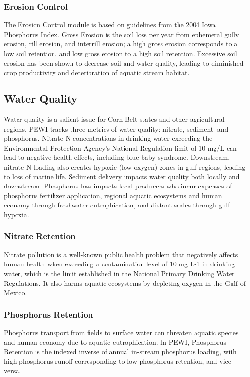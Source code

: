 \documentclass[11pt]{article}
\begin{document}
 
\cleardoublepage
\newpage

\subsubsection{Erosion Control}
The Erosion Control module is based on guidelines from the 2004 Iowa Phosphorus Index. Gross Erosion is the soil loss per year from ephemeral gully erosion, rill erosion, and interrill erosion; a high gross erosion corresponds to a low soil retention, and low gross erosion to a high soil retention. Excessive soil erosion has been shown to decrease soil and water quality, leading to diminished crop productivity and deterioration of aquatic stream habitat.\cite{36}

\subsection{Water Quality}
Water quality is a salient issue for Corn Belt states and other agricultural regions. PEWI tracks three metrics of water quality: nitrate, sediment, and phosphorus. Nitrate-N concentrations in drinking water exceeding the Environmental Protection Agency’s National Regulation limit of 10 mg/L can lead to negative health effects, including blue baby syndrome.\cite{37}  Downstream, nitrate-N loading also creates hypoxic (low-oxygen) zones in gulf regions, leading to loss of marine life.\cite{38}  Sediment delivery impacts water quality both locally and downstream.\cite{39} Phosphorus loss impacts local producers who incur expenses of phosphorus fertilizer application, regional aquatic ecosystems and human economy through freshwater eutrophication, and distant scales through gulf hypoxia.\cite{40} 

\subsubsection{Nitrate Retention}
Nitrate pollution is a well-known public health problem that negatively affects human health when exceeding a contamination level of 10 mg L-1 in drinking water, which is the limit established in the National Primary Drinking Water Regulations.  It also harms aquatic ecosystems by depleting oxygen in the Gulf of Mexico.\cite{41}

\subsubsection{Phosphorus Retention}
Phosphorus transport from fields to surface water can threaten aquatic species and human economy due to aquatic eutrophication. In PEWI, Phosphorus Retention is the indexed inverse of annual in-stream phosphorus loading, with high phosphorus runoff corresponding to low phosphorus retention, and vice versa.
\end{document}
